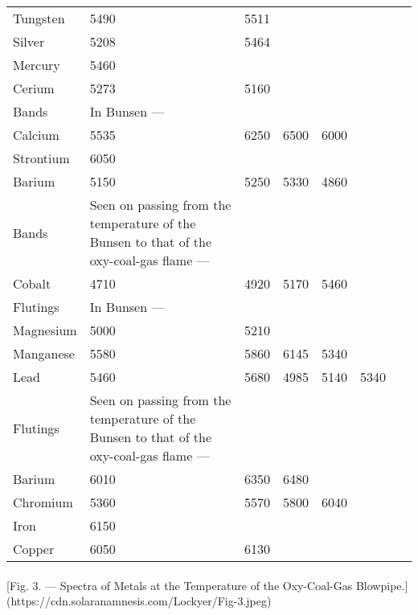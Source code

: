 \documentclass[a4paper, 12pt, oneside, polutonikogreek, english]{article}
\begin{document}
\begin{table}[H]
\begin{tabular}{l p{34mm} r r r r r}
         Tungsten  & 5490 & 5511 &     &     &     &     \\ 
         Silver   & 5208 & 5464 &     &     &     &     \\ 
         Mercury   & 5460 &     &     &     &     &     \\ 
         Cerium   & 5273 & 5160 &     &     &     &     \\ \hline\hline
         Bands    &  In Bunsen ---                                       &     &     &     &     &     \\ \hline
         Calcium   & 5535 & 6250 & 6500 & 6000 &     &     \\ 
         Strontium  & 6050 &     &     &     &     &     \\ 
         Barium   & 5150 & 5250 & 5330 & 4860 &     &     \\ \hline\hline
         Bands    &  Seen on passing from the temperature of the Bunsen to that of the oxy-coal-gas flame ---  &     &     &     &     &     \\ \hline
         Cobalt   & 4710 & 4920 & 5170 & 5460 &     &     \\ \hline\hline
         Flutings  &  In Bunsen ---                                       &     &     &     &     &     \\ \hline
         Magnesium  & 5000 & 5210 &     &     &     &     \\ 
         Manganese  & 5580 & 5860 & 6145 & 5340 &     &     \\ 
         Lead    & 5460 & 5680 & 4985 & 5140 & 5340 &     \\ \hline\hline
         Flutings  &  Seen on passing from the temperature of the Bunsen to that of the oxy-coal-gas flame ---  &     &     &     &     &     \\ \hline
         Barium   & 6010 & 6350 & 6480 &     &     &     \\ 
         Chromium  & 5360 & 5570 & 5800 & 6040 &     &     \\ 
         Iron    & 6150 &     &     &     &     &     \\ 
         Copper   & 6050 & 6130 & ~ & ~ & ~ & ~ \\ 
    \end{tabular}
\end{table}
\paragraph{}
[Fig. 3. --- Spectra of Metals at the Temperature of the Oxy-Coal-Gas Blowpipe.](https://cdn.solaranamnesis.com/Lockyer/Fig-3.jpeg)
\end{document}
